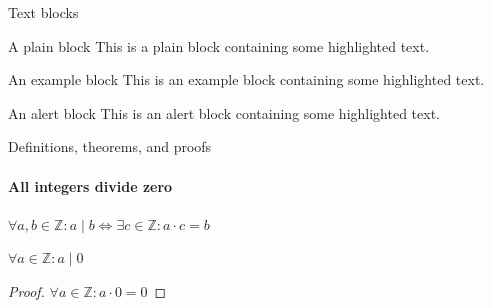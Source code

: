\documentclass{beamer}
\begin{document}
\begin{darkframes}
\begin{frame}[label=simmonshall]{Text blocks}
      \begin{block}{A plain block}
        This is a plain block containing some \alert{highlighted text}.
      \end{block}
      \begin{exampleblock}{An example block}
        This is an example block containing some \alert{highlighted text}.
      \end{exampleblock}
      \begin{alertblock}{An alert block}
        This is an alert block containing some \alert{highlighted text}.
      \end{alertblock}
    \end{frame}

    \begin{frame}[label=proof]{Definitions, theorems, and proofs}
      \framesubtitle{All integers divide zero}
      \begin{definition}
        $\forall a,b\in\mathds{Z}: a\mid b\iff\exists c\in\mathds{Z}:a\cdot c=b$
      \end{definition}
      \begin{theorem}
        $\forall a\in\mathds{Z}: a\mid 0$
      \end{theorem}
      \begin{proof}[Proof\nopunct]
        $\forall a\in\mathds{Z}: a\cdot 0=0$
      \end{proof}
    \end{frame}


\end{darkframes}
\end{document}
